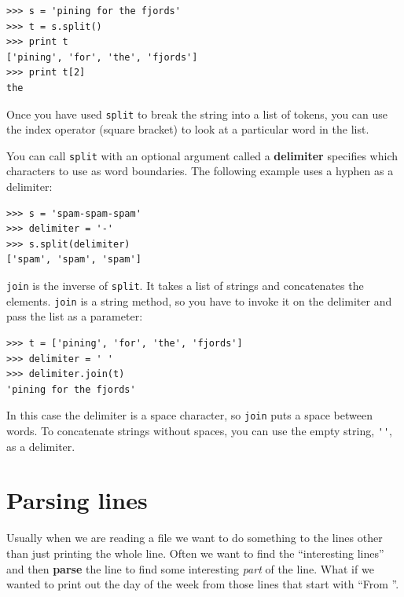 \documentclass[10pt]{book}
\begin{document}

\beforeverb
\begin{verbatim}
>>> s = 'pining for the fjords'
>>> t = s.split()
>>> print t
['pining', 'for', 'the', 'fjords']
>>> print t[2]
the
\end{verbatim}
\afterverb
%
Once you have used {\tt split} to break the string into 
a list of tokens, you can use the index operator (square
bracket) to look at a particular word in the list.

You can call {\tt split} with 
an optional argument called a {\bf delimiter} specifies which
characters to use as word boundaries.
The following example
uses a hyphen as a delimiter:


\beforeverb
\begin{verbatim}
>>> s = 'spam-spam-spam'
>>> delimiter = '-'
>>> s.split(delimiter)
['spam', 'spam', 'spam']
\end{verbatim}
\afterverb
%
{\tt join} is the inverse of {\tt split}.  It
takes a list of strings and
concatenates the elements.  {\tt join} is a string method,
so you have to invoke it on the delimiter and pass the
list as a parameter:


\beforeverb
\begin{verbatim}
>>> t = ['pining', 'for', 'the', 'fjords']
>>> delimiter = ' '
>>> delimiter.join(t)
'pining for the fjords'
\end{verbatim}
\afterverb
%
In this case the delimiter is a space character, so
{\tt join} puts a space between words.  To concatenate
strings without spaces, you can use the empty string,
\verb"''", as a delimiter. 



\section{Parsing lines}

Usually when we are reading a file 
we want to do something to the lines other than just 
printing the whole line.  Often we want to find the ``interesting
lines'' and then {\bf parse} the line to find some interesting
\emph{part} of the line.  What if we wanted to print out the day of the 
week from those lines that start with ``From ''.
\end{document}
